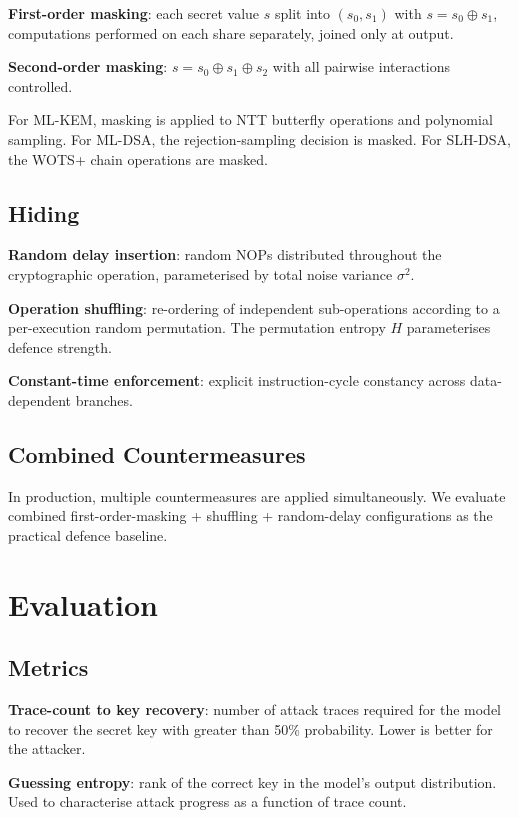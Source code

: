 \documentclass[sigconf,nonacm]{acmart}
\begin{document}
\textbf{First-order masking}: each secret value $s$ split into
$(s_0, s_1)$ with $s = s_0 \oplus s_1$, computations performed on each
share separately, joined only at output.

\textbf{Second-order masking}: $s = s_0 \oplus s_1 \oplus s_2$ with
all pairwise interactions controlled.

For ML-KEM, masking is applied to NTT butterfly operations and
polynomial sampling. For ML-DSA, the rejection-sampling decision is
masked. For SLH-DSA, the WOTS+ chain operations are masked.

\subsection{Hiding}

\textbf{Random delay insertion}: random NOPs distributed throughout
the cryptographic operation, parameterised by total noise variance
$\sigma^2$.

\textbf{Operation shuffling}: re-ordering of independent sub-operations
according to a per-execution random permutation. The permutation
entropy $H$ parameterises defence strength.

\textbf{Constant-time enforcement}: explicit instruction-cycle
constancy across data-dependent branches.

\subsection{Combined Countermeasures}

In production, multiple countermeasures are applied simultaneously.
We evaluate combined first-order-masking + shuffling + random-delay
configurations as the practical defence baseline.

\section{Evaluation}

\subsection{Metrics}

\textbf{Trace-count to key recovery}: number of attack traces required
for the model to recover the secret key with greater than 50\%
probability. Lower is better for the attacker.

\textbf{Guessing entropy}: rank of the correct key in the model's output
distribution. Used to characterise attack progress as a function of
trace count.
\end{document}
